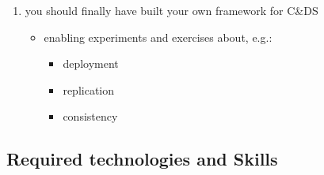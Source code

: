 \documentclass[handout]{beamer}\mode<presentation>{\usetheme{AMSCesenaPurpleAndGold}}
\begin{document}
\begin{frame}[allowframebreaks]
\begin{enumerate}
		\medskip
	
		\item you should finally have built your own framework for C\&DS
		\begin{itemize}
			\item enabling experiments and exercises about, e.g.:
			\begin{itemize}
				\item deployment
				\item replication
				\item consistency
			\end{itemize}
		\end{itemize}
		
	\end{enumerate}
	
\end{frame}

\subsection{Required technologies and Skills}
\end{document}
